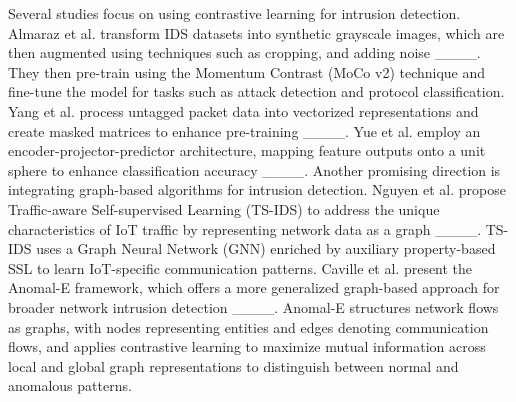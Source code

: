 Several studies focus on using contrastive learning for intrusion detection. Almaraz et al. transform IDS datasets into synthetic grayscale images, which are then augmented using techniques such as cropping, and adding noise ____. They then pre-train using the Momentum Contrast (MoCo v2) technique and fine-tune the model for tasks such as attack detection and protocol classification. Yang et al. process untagged packet data into vectorized representations and create masked matrices to enhance pre-training ____. Yue et al. employ an encoder-projector-predictor architecture, mapping feature outputs onto a unit sphere to enhance classification accuracy ____. 
Another promising direction is integrating graph-based algorithms for intrusion detection. Nguyen et al. propose Traffic-aware Self-supervised Learning (TS-IDS) to address the unique characteristics of IoT traffic by representing network data as a graph ____. TS-IDS uses a Graph Neural Network (GNN) enriched by auxiliary property-based SSL to learn IoT-specific communication patterns. Caville et al. present the Anomal-E framework, which offers a more generalized graph-based approach for broader network intrusion detection ____. Anomal-E structures network flows as graphs, with nodes representing entities and edges denoting communication flows, and applies contrastive learning to maximize mutual information across local and global graph representations to distinguish between normal and anomalous patterns. 

